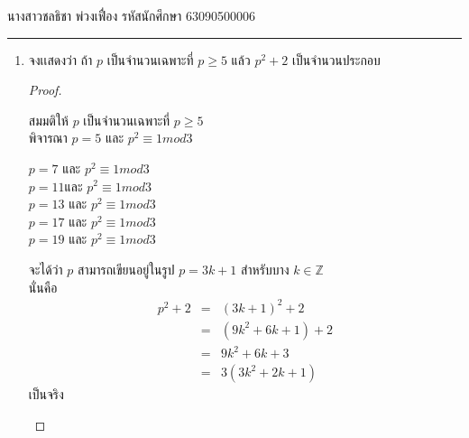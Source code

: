 \documentclass[12pt, a4paper]{article}
\begin{document}
\raggedleft นางสาวชลธิชา พ่วงเฟื่อง  รหัสนักศึกษา 63090500006 \\[12pt]
\hrule\vspace{12pt}
\raggedright

\begin{enumerate}
    \item จงเเสดงว่า ถ้า $p$ เป็นจำนวนเฉพาะที่ $p\geq 5$  แล้ว $p^{2}+2$ เป็นจำนวนประกอบ\\ 
    
    
    \begin{proof}
        \begin{enumerate}สมมติให้ $p$ เป็นจำนวนเฉพาะที่ $p\geq 5$ \\
        \hspace{1cm.}พิจารณา $p=5$ และ $p^{2}\equiv  1 mod 3$\\       
                \begin{center}   
                
                        $p=7$ และ $p^{2}\equiv 1 mod 3$\\
                        $p=11$และ $p^{2}\equiv 1mod 3$\\
                        $p=13$ และ $p^{2}\equiv1 mod 3$\\
                        $p=17$ และ $p^{2}\equiv 1 mod 3$\\
                        $p=19$ และ $p^{2}\equiv 1 mod 3$\\
                        
                \end{center}
        \hspace{1cm.}จะได้ว่า $p$ สามารถเขียนอยู่ในรูป $p=3k+1$ สำหรับบาง $k\in \mathbb{Z} $ \\
        \hspace{1cm.}นั่นคือ
                \begin{eqnarray*}
                    p^{2}+2
                    &=& \left (3k+1 \right )^{2}+2\\
                    &=& \left (9k^{2}+6k+1  \right )+2\\
                    &=& 9k^{2}+6k+3\\
                    &=& 3\left ( 3k^{2}+2k+1 \right )
                \end{eqnarray*}
        \hspace{1cm.}เป็นจริง 
        \end{enumerate}
    \end{proof}

\end{enumerate}
\end{document}
